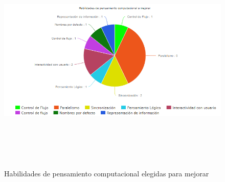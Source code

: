 \documentclass[a4paper, 12pt]{book}
\begin{document}
\begin{figure}[h]
	\centering
	\graphicspath{{img/}}
  \includegraphics[bb=0 0 800 600, width=18cm, height=11cm, keepaspectratio]{habilidadestest.png}
	\caption{Habilidades de pensamiento computacional elegidas para mejorar}
  \label{figura:foro_hilos}
\end{figure}



\cleardoublepage

%
\end{document}
